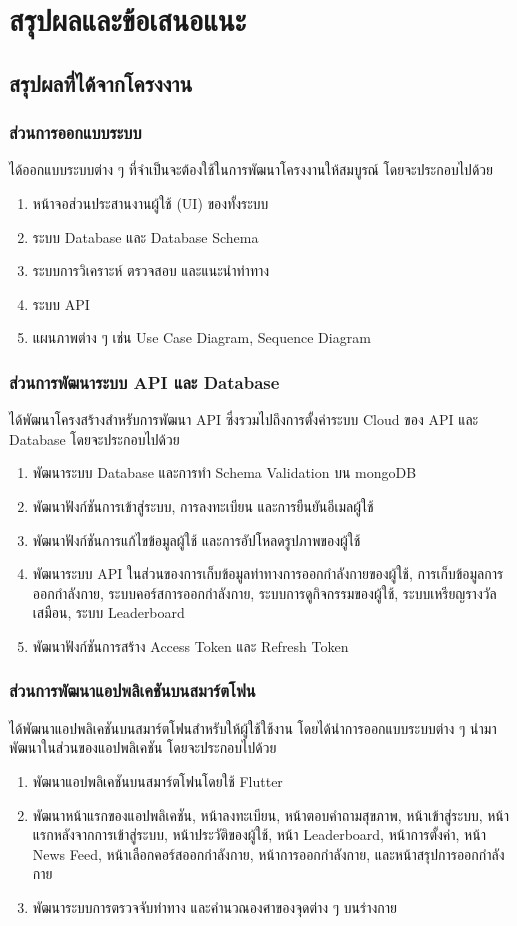 \chapter{สรุปผลและข้อเสนอแนะ}
\section{สรุปผลที่ได้จากโครงงาน}
\subsection{ส่วนการออกแบบระบบ}
ได้ออกแบบระบบต่าง ๆ ที่จำเป็นจะต้องใช้ในการพัฒนาโครงงานให้สมบูรณ์ โดยจะประกอบไปด้วย
\begin{enumerate}
    \item หน้าจอส่วนประสานงานผู้ใช้ (UI) ของทั้งระบบ
    \item ระบบ Database และ Database Schema
    \item ระบบการวิเคราะห์ ตรวจสอบ และแนะนำท่าทาง
    \item ระบบ API
    \item แผนภาพต่าง ๆ เช่น Use Case Diagram, Sequence Diagram
\end{enumerate}

\subsection{ส่วนการพัฒนาระบบ API และ Database}
ได้พัฒนาโครงสร้างสำหรับการพัฒนา API ซึ่งรวมไปถึงการตั้งค่าระบบ Cloud ของ API และ Database โดยจะประกอบไปด้วย
\begin{enumerate}
    \item พัฒนาระบบ Database และการทำ Schema Validation บน mongoDB
    \item พัฒนาฟังก์ชันการเข้าสู่ระบบ, การลงทะเบียน และการยืนยันอีเมลผู้ใช้
    \item พัฒนาฟังก์ชันการแก้ไขข้อมูลผู้ใช้ และการอัปโหลดรูปภาพของผู้ใช้
    \item พัฒนาระบบ API ในส่วนของการเก็บข้อมูลท่าทางการออกกำลังกายของผู้ใช้, การเก็บข้อมูลการออกกำลังกาย, ระบบคอร์สการออกกำลังกาย, ระบบการดูกิจกรรมของผู้ใช้, ระบบเหรียญรางวัลเสมือน, ระบบ Leaderboard
    \item พัฒนาฟังก์ชันการสร้าง Access Token และ Refresh Token
\end{enumerate}

\subsection{ส่วนการพัฒนาแอปพลิเคชันบนสมาร์ตโฟน}
ได้พัฒนาแอปพลิเคชันบนสมาร์ตโฟนสำหรับให้ผู้ใช้ใช้งาน โดยได้นำการออกแบบระบบต่าง ๆ นำมาพัฒนาในส่วนของแอปพลิเคชัน โดยจะประกอบไปด้วย
\begin{enumerate}
    \item พัฒนาแอปพลิเคชันบนสมาร์ตโฟนโดยใช้ Flutter
    \item พัฒนาหน้าแรกของแอปพลิเคชัน, หน้าลงทะเบียน, หน้าตอบคำถามสุขภาพ, หน้าเข้าสู่ระบบ, หน้าแรกหลังจากการเข้าสู่ระบบ, หน้าประวัติของผู้ใช้, หน้า Leaderboard, หน้าการตั้งค่า, หน้า News Feed, หน้าเลือกคอร์สออกกำลังกาย, หน้าการออกกำลังกาย, และหน้าสรุปการออกกำลังกาย
    \item พัฒนาระบบการตรวจจับท่าทาง และคำนวณองศาของจุดต่าง ๆ บนร่างกาย
\end{enumerate}

